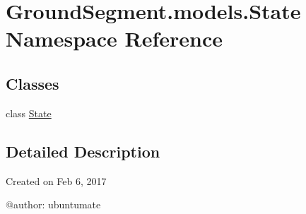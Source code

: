 \hypertarget{namespace_ground_segment_1_1models_1_1_state}{}\section{Ground\+Segment.\+models.\+State Namespace Reference}
\label{namespace_ground_segment_1_1models_1_1_state}
\subsection*{Classes}
\begin{DoxyCompactItemize}
\item 
class \hyperlink{class_ground_segment_1_1models_1_1_state_1_1_state}{State}
\end{DoxyCompactItemize}


\subsection{Detailed Description}
\begin{DoxyVerb}Created on Feb 6, 2017

@author: ubuntumate
\end{DoxyVerb}
 